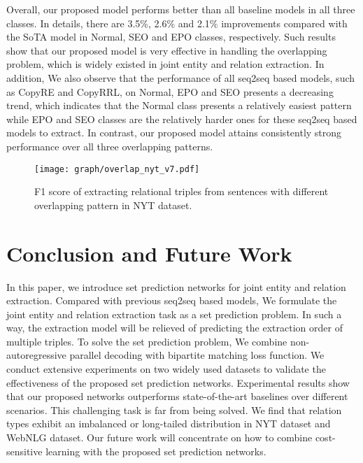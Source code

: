 \documentclass[letterpaper]{article} \usepackage{aaai21}  \usepackage{times}  \usepackage{helvet} \usepackage{courier}  \usepackage[hyphens]{url}  \usepackage{graphicx} \usepackage{amsfonts,amssymb}
\begin{document}
Overall, our proposed model performs better than all baseline models in all three classes.  In details, there are 3.5\%, 2.6\% and 2.1\% improvements compared with the SoTA model \cite{wei-etal-2020-novel} in Normal, SEO and EPO classes, respectively. Such results show that our proposed model is very effective in handling the overlapping problem, which is widely existed in joint entity and relation extraction. In addition,  We also observe that the performance of all seq2seq based models, such as CopyRE \cite{zeng2018extracting} and CopyRRL\cite{zeng2019learning}, on Normal, EPO and SEO presents a decreasing trend, which indicates that the Normal class presents a relatively easiest pattern while EPO and SEO classes are the relatively harder ones for these seq2seq based models to extract. In contrast, our 
proposed model attains consistently strong performance over all three overlapping patterns.
\begin{figure}[t]
  	\begin{center} \texttt{[image: graph/overlap\_nyt\_v7.pdf]}
  	\caption{F1 score of extracting relational triples from sentences with different overlapping pattern in NYT dataset.} \label{overlap}
  \end{center}
  \end{figure}


  



\section{Conclusion and Future Work}
In this paper, we introduce set prediction networks for joint entity and relation extraction. Compared with previous seq2seq based models, We formulate the  joint entity and relation extraction task as a set prediction problem. In such a way, the extraction model will be relieved of predicting the extraction order of multiple triples. To solve the set prediction problem, We combine non-autoregressive parallel decoding with bipartite matching loss function. We conduct extensive experiments on two widely used datasets to validate the effectiveness of the proposed set prediction networks. Experimental results show that our proposed networks outperforms state-of-the-art baselines over different scenarios. This challenging task is far from being solved. We find that relation types exhibit an imbalanced or long-tailed distribution in NYT dataset and WebNLG dataset. Our future work will concentrate on how to combine cost-sensitive learning with the proposed set prediction networks. 
\end{document}
